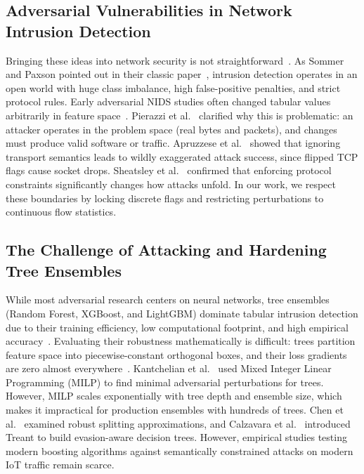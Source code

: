 \documentclass[final,5p,times,twocolumn]{elsarticle}
\begin{document}
\subsection{Adversarial Vulnerabilities in Network Intrusion Detection}
Bringing these ideas into network security is not straightforward~\cite{corona2013adversarial}. As Sommer and Paxson pointed out in their classic paper~\cite{sommer2010outside}, intrusion detection operates in an open world with huge class imbalance, high false-positive penalties, and strict protocol rules. Early adversarial NIDS studies often changed tabular values arbitrarily in feature space~\cite{alhajjar2021adversarial}. Pierazzi et al.~\cite{pierazzi2020intriguing} clarified why this is problematic: an attacker operates in the problem space (real bytes and packets), and changes must produce valid software or traffic. Apruzzese et al.~\cite{apruzzese2022modeling} showed that ignoring transport semantics leads to wildly exaggerated attack success, since flipped TCP flags cause socket drops. Sheatsley et al.~\cite{sheatsley2022space} confirmed that enforcing protocol constraints significantly changes how attacks unfold. In our work, we respect these boundaries by locking discrete flags and restricting perturbations to continuous flow statistics.

\subsection{The Challenge of Attacking and Hardening Tree Ensembles}
While most adversarial research centers on neural networks, tree ensembles (Random Forest, XGBoost, and LightGBM) dominate tabular intrusion detection due to their training efficiency, low computational footprint, and high empirical accuracy~\cite{breiman2001random,chen2016xgboost,ke2017lightgbm}. Evaluating their robustness mathematically is difficult: trees partition feature space into piecewise-constant orthogonal boxes, and their loss gradients are zero almost everywhere~\cite{kantchelian2016evasion}. Kantchelian et al.~\cite{kantchelian2016evasion} used Mixed Integer Linear Programming (MILP) to find minimal adversarial perturbations for trees. However, MILP scales exponentially with tree depth and ensemble size, which makes it impractical for production ensembles with hundreds of trees. Chen et al.~\cite{chen2019robust} examined robust splitting approximations, and Calzavara et al.~\cite{calzavara2020treant} introduced Treant to build evasion-aware decision trees. However, empirical studies testing modern boosting algorithms against semantically constrained attacks on modern IoT traffic remain scarce.
\end{document}
